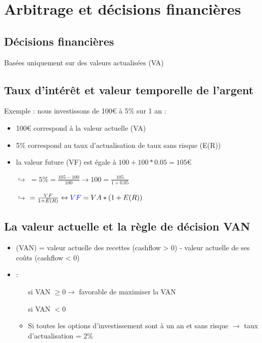 \addtocounter{chapter}{1}
\chapter{Arbitrage et décisions financières}

\section{Décisions financières}

Basées uniquement sur des valeurs actualisées (VA)

\section{Taux d'intérêt et valeur temporelle de l'argent}

Exemple : nous investissons de 100€ à 5\% sur 1 an :
\begin{itemize}
    \item 100€ correspond à la valeur actuelle (VA)
    \item 5\% correspond au taux d'actualisation de taux sans risque (E(R))
    \item la valeur future (VF)  est égale à $100 + 100 * 0.05 = 105$€
\end{itemize}

\begin{itemize}
    \item[$\hookrightarrow$]  $= 5\% = \frac{105-100}{100} \rightarrow 100 = \frac{105}{1 + 0.05}$
    \item[$\hookrightarrow$]  $= \frac{VF}{1 + E(R)} \leftrightarrow \textblue{VF} = VA * (1 + E(R))$
\end{itemize}

\section{La valeur actuelle et la règle de décision VAN}

\begin{itemize}
    \item {} (VAN) = valeur actuelle des recettes (cashflow > 0) - valeur actuelle de ses coûts (cashflow < 0)
    \item {} :
    \begin{itemize}
        \item[\textgreen{V}] si VAN $\geq 0 \rightarrow$ favorable de maximiser la VAN
        \item[\textred{X}] si VAN $< 0$
        \item Si toutes les options d'investissement sont à un an et sans risque $\rightarrow$ taux d'actualisation = 2\%
    \end{itemize}
\end{itemize}


